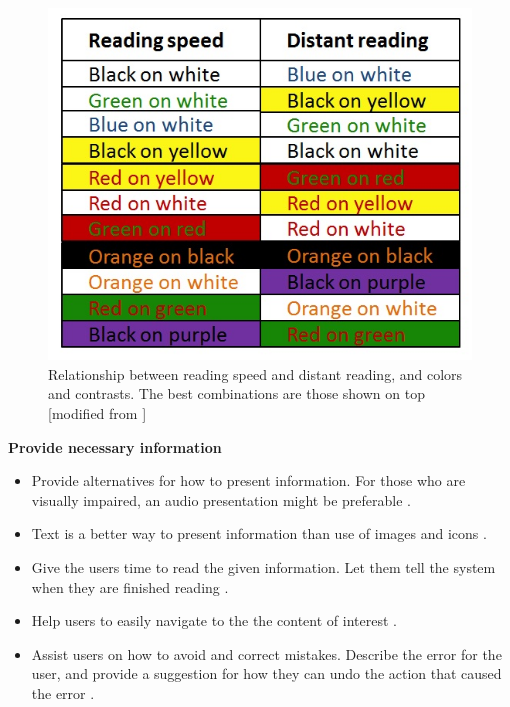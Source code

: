 \begin{figure} [ht!]
\centering
\includegraphics[scale=0.8]{readingcolors.jpg}
\caption[Colors and contrasts]{Relationship between reading speed and distant reading, and colors and contrasts. The best combinations are those shown on top [modified from \cite{blindeforbundetTekst}]}
\label{fig:colors}
\end{figure}

\textbf{Provide necessary information}
\begin{itemize}
\item Provide alternatives for how to present information. For those who are visually impaired, an audio presentation might be preferable \cite{blindeforbundetTekst} \cite{w3cTekst}. 
\item Text is a better way to present information than use of images and icons \cite{w3cTekst}.
\item Give the users time to read the given information. Let them tell the system when they are finished reading \cite{w3cTekst}.  
\item Help users to easily navigate to the the content of interest \cite{w3cTekst}.
\item Assist users on how to avoid and correct mistakes. Describe the error for the user, and provide a suggestion for how they can undo the action that caused the error \cite{w3cTekst}.      
\end{itemize}

